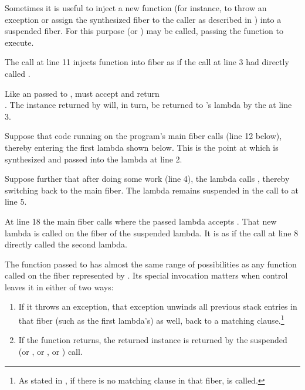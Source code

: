 \label{resumewith}
Sometimes it is useful to inject a new function (for instance, to throw an
exception or assign the synthesized fiber to the caller as described in
) into a suspended fiber. For this purpose
 (or \xtresumewith) may be called, passing the
function  to execute.


The \resumewith call at line 11 injects function  into
fiber  as if the \resume call at line 3 had directly
called .

Like an \entryfn passed to \fiber,  must accept
 and return\\
\fiber. The \fiber instance returned by  will, in turn, be returned
to 's lambda by the \resume at line 3.

Suppose that code running on the program's main fiber calls \resume (line 12 below), thereby
entering the first lambda shown below. This is the point at which  is
synthesized and passed into the lambda at line 2.

Suppose further that after doing some work (line 4), the lambda calls
, thereby switching back to the main fiber. The lambda remains
suspended in the call to  at line 5.

At line 18 the main fiber calls  where the passed lambda
accepts . That new lambda is called on the fiber of the suspended
lambda. It is as if the  call at line 8 directly called the second
lambda.

The function passed to \resumewith has almost the same range of possibilities as
any function called on the fiber represented by . Its special invocation
matters when control leaves it in either of two ways:

\begin{enumerate}
  \item If it throws an exception, that exception unwinds all previous stack
        entries in that fiber (such as the first lambda's) as well, back to
        a matching  clause.\footnote{As stated
        in , if there is no matching 
        clause in that fiber,  is called.}
  \item If the function returns, the returned \fiber instance is returned by
        the suspended  (or \resumewith, or \xtresume, or
        \xtresumewith) call.
\end{enumerate}

